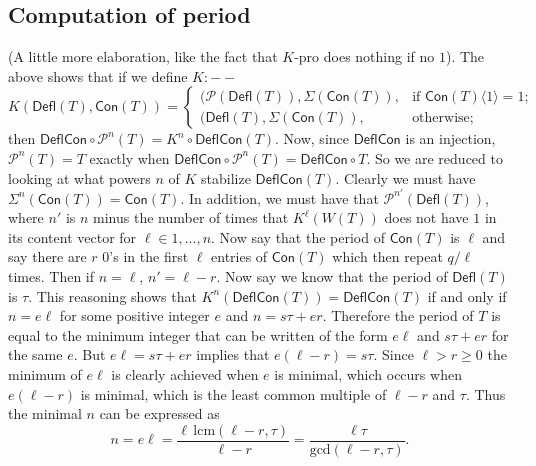 \documentclass[12pt]{amsart}
\theoremstyle{definition}
\theoremstyle{remark}
\numberwithin{equation}{section}
\newcommand{\pro}{\mathcal{P}}
\newcommand{\deflate}{\ensuremath{\mathsf{Defl}}}
\newcommand{\content}{\ensuremath{\mathsf{Con}}}
\newcommand{\compress}{\ensuremath{\mathsf{DeflCon}}}
\begin{document}
\subsection{Computation of period}\label{sec:period}
  (A little more elaboration, like the fact that $K$-pro does nothing if no $1$). The above shows that if we define $K: --$
\begin{dmath*}
K(\deflate(T),\content(T)) =
\begin{cases}
    (\pro(\deflate(T)),\Sigma(\content(T)),  & \text{if } \content(T)\langle 1 \rangle = 1; \\        
   (\deflate(T),\Sigma(\content(T)), & \text{otherwise;}
\end{cases}
\end{dmath*}
then $\compress \circ \pro^n(T) = K^n \circ \compress(T)$. Now, since $\compress$ is an injection, $\pro^n(T) = T$ exactly when $\compress \circ \pro^n(T) = \compress \circ T$. So we are reduced to looking at what powers $n$ of $K$ stabilize $\compress(T)$. 
Clearly we must have $\Sigma^n(\content(T)) = \content(T)$.  In addition, we must have that $\pro^{n'}(\deflate(T))$, where $n'$ is $n$ minus the number of times that $K^\ell(W(T))$ does not have $1$ in its content vector for $\ell \in 1,...,n$. 
Now say that the period of $\content(T)$ is $\ell$ and say there are $r$ $0$'s in the first $\ell$ entries of $\content(T)$ which then repeat $q/\ell$ times. Then if $n = \ell$, $n' = \ell - r$. Now say we know that the period of $\deflate(T)$ is $\tau$. This reasoning shows that $K^n (\compress(T)) = \compress(T)$ if and only if $n = e \ell$ for some positive integer $e$ and $n = s \tau + e  r$. Therefore the period of $T$ is equal to the minimum integer that can be written of the form $e \ell$ and $s \tau + e r$ for the same $e$. But $e \ell = s\tau + er$ implies that $e(\ell-r) = s\tau$. Since $\ell > r \geq 0$ the minimum of $e \ell$ is clearly achieved when $e$ is minimal, which occurs when $e(\ell-r)$ is minimal, which is the least common multiple of $\ell-r$ and $\tau$. Thus the minimal $n$ can be expressed as 
\begin{equation*}
n = e \ell = \frac{\ell \, \text{lcm}(\ell-r,\tau)}{\ell-r} = \frac{\ell \tau}{\text{gcd}(\ell-r,\tau)}. 
\end{equation*}
\end{document}
